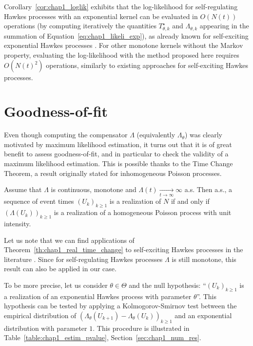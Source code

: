 Corollary~\ref{cor:chap1_loglik} exhibits that the log-likelihood for
self-regulating Hawkes processes with an exponential kernel can be evaluated in $O(N(t))$ operations (by computing iteratively the quantities $T_{\theta, k}^\star$ and $\Lambda_{\theta, k}$ appearing in the summation of Equation~\eqref{eq:chap1_likeli_exp}),
as already known
for self-exciting exponential Hawkes processes \textcite[Chapter 4.2]{Laub2014}.
For other monotone kernels without the Markov property, evaluating the log-likelihood with the method proposed here requires $O(N(t)^2)$ operations, similarly to existing approaches for self-exciting Hawkes processes.

\section{Goodness-of-fit}
\label{sec:chap1_goodness}

Even though computing the compensator $\Lambda$ (equivalently $\Lambda_\theta$) was clearly motivated by maximum likelihood estimation, it turns out that it is of great benefit to assess goodness-of-fit, and in particular to check the validity of a maximum likelihood estimation.
This is possible thanks to the Time Change Theorem, a result originally stated for inhomogeneous Poisson processes.

\begin{theorem}\label{th:chap1_real_time_change}
  Assume that $\Lambda$ is continuous, monotone and $\Lambda(t)\xrightarrow[t\rightarrow \infty]{} \infty$ a.s.
  Then a.s., a sequence of event times $(U_k)_{k\ge 1}$ is a realization of $N$ if and only if $(\Lambda(U_k))_{k \ge 1}$ is a realization of a homogeneous Poisson process with unit intensity.
\end{theorem}

Let us note that we can find applications of Theorem~\ref{th:chap1_real_time_change} to self-exciting Hawkes processes in the literature \parencite[Chapter 5]{Laub2014}.
Since for self-regulating Hawkes processes \(\Lambda\) is still monotone, this result can also be applied in our case.

To be more precise, let us consider \(\theta \in \Theta\) and the null hypothesis: ``$(U_k)_{k\ge 1}$ is a realization of an exponential Hawkes process with parameter \(\theta\)''.
This hypothesis can be tested by applying a Kolmogorov-Smirnov test between the empirical distribution of $\left( \Lambda_\theta(U_{k+1}) - \Lambda_\theta(U_k) \right)_{k \ge 1}$ and an exponential distribution with parameter \(1\).
This procedure is illustrated in Table~\ref{table:chap1_estim_pvalue}, Section~\ref{sec:chap1_num_res}.

